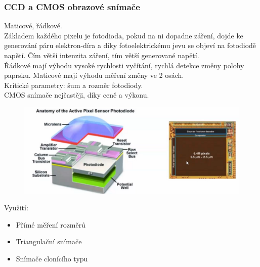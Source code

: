 \subsubsection{CCD a CMOS obrazové snímače}
Maticové, řádkové.\\
Základem každého pixelu je fotodioda, pokud na ni dopadne záření, dojde ke generování páru elektron-díra a díky fotoelektrickému jevu se objeví na fotodiodě napětí. Čím větší intenzita záření, tím větší generované napětí.\\
Řádkové mají výhodu vysoké rychlosti vyčítání, rychlá detekce změny polohy paprsku. Maticové mají výhodu měření změny ve 2 osách.\\
Kritické parametry: šum a rozměr fotodiody.\\
CMOS snímače nejčastěji, díky ceně a výkonu.\\
\begin{figure}[h!]
    \centering
    \includegraphics[scale = 0.2]{img/CMOS.png}
\end{figure}

Využití:
\begin{itemize}
    \item Přímé měření rozměrů
    \item Triangulační snímače
    \item Snímače clonícího typu
\end{itemize}

